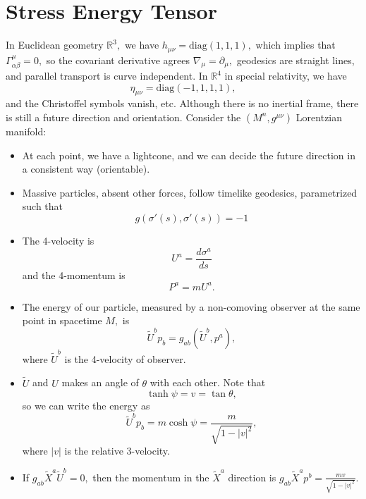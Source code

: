 \documentclass{article}
\numberwithin{equation}{section}
\begin{document}
\section{Stress Energy Tensor}
In Euclidean geometry $\mathbb{R}^3,$ we have $h_{\mu \nu} = \text{diag}(1,1,1),$ which implies that $\Gamma^{\mu}_{\alpha\beta} = 0,$ so the covariant derivative agrees $\nabla_\mu = \partial_\mu,$ geodesics are straight lines, and parallel transport is curve independent. In $\mathbb{R}^4$ in special relativity, we have 
\begin{equation*}
    \eta_{\mu\nu} = \text{diag}(-1,1,1,1),
\end{equation*}
and the Christoffel symbols vanish, etc. Although there is no inertial frame, there is still a future direction and orientation. Consider the $(M^n,g^{\mu\nu})$ Lorentzian manifold:
\begin{itemize}
    \item At each point, we have a lightcone, and we can decide the future direction in a consistent way (orientable).
    \item Massive particles, absent other forces, follow timelike geodesics, parametrized such that 
    \begin{equation*}
        g(\sigma'(s), \sigma'(s)) = -1
    \end{equation*}
    \item The 4-velocity is 
    \begin{equation*}
        U^a = \frac{d\sigma^a}{ds}
    \end{equation*}
    and the 4-momentum is 
    \begin{equation*}
        P^a = mU^a.
    \end{equation*}
    \item The energy of our particle, measured by a non-comoving observer at the same point in spacetime $M,$ is 
    \begin{equation*}
        \tilde{U}^b p_b = g_{ab}(\tilde{U}^b, p^a),
    \end{equation*}
    where $\tilde{U}^b$ is the 4-velocity of observer.
    \item $\tilde{U}$ and $U$ makes an angle of $\theta$ with each other. Note that 
    \begin{equation*}
        \tanh\psi = v = \tan\theta,
    \end{equation*}
    so we can write the energy as 
    \begin{equation*}
        \tilde{U}^b p_b = m\cosh\psi = \frac{m}{\sqrt{1-|v|^2}},
    \end{equation*}
    where $|v|$ is the relative 3-velocity.
    \item If $g_{ab}\tilde{X}^a\tilde{U}^b=0,$ then the momentum in the $\tilde{X}^a$ direction is $g_{ab}\tilde{X}^ap^b = \frac{mv}{\sqrt{1-|v|^2}}.$
\end{itemize}
\end{document}
